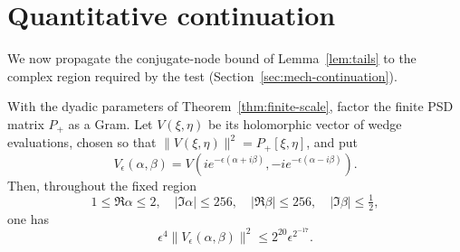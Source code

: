 \section{Quantitative continuation}\label{sec:continuation}
We now propagate the conjugate-node bound of Lemma~\ref{lem:tails} to
the complex region required by the test
(Section~\ref{sec:mech-continuation}).


\begin{lemma}\label{lem:continuation} With the dyadic parameters
of Theorem~\ref{thm:finite-scale}, factor the finite PSD matrix \(P_+\) as a Gram. Let \(V(\xi,\eta)\)
be its holomorphic vector of wedge evaluations, chosen so that
$\|V(\xi,\eta)\|^2=P_+[\xi,\eta]$, and put
\[
 V_\epsilon(\alpha,\beta)=V(i e^{-\epsilon(\alpha+i\beta)},-i e^{-\epsilon(\alpha-i\beta)}).
\]
Then, throughout the fixed region
\[
 1\le\Re \alpha\le2,\quad |\Im \alpha|\le256,\quad
 |\Re \beta|\le256,\quad |\Im \beta|\le\tfrac12,
\]
one has
\begin{equation}
 \epsilon^4\|V_\epsilon(\alpha,\beta)\|^2
                       \le2^{20}\epsilon^{2^{-17}}.    \label{eq:continuation-bound}
\end{equation}
\end{lemma}
